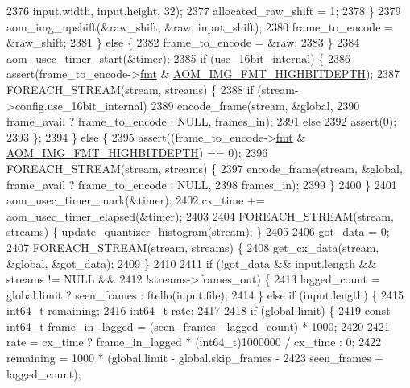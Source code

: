 \begin{DoxyCodeInclude}
{{{{{{{{{{{{{{{{{{{{{{{{{{{{{{{{{{{{{{{{{{{{{{{{{{{{{{{{{{2376                           input.width, input.height, 32);
2377             allocated\_raw\_shift = 1;
2378           \}
2379           aom\_img\_upshift(&raw\_shift, &raw, input\_shift);
2380           frame\_to\_encode = &raw\_shift;
2381         \} \textcolor{keywordflow}{else} \{
2382           frame\_to\_encode = &raw;
2383         \}
2384         aom\_usec\_timer\_start(&timer);
2385         \textcolor{keywordflow}{if} (use\_16bit\_internal) \{
2386           assert(frame\_to\_encode->\hyperlink{structaom__image_a6c64b1ab918d80d52eb8f5d6d957e825}{fmt} & \hyperlink{aom__image_8h_a607b37d91f75442f54223ecd85f1b6cb}{AOM\_IMG\_FMT\_HIGHBITDEPTH});
2387           FOREACH\_STREAM(stream, streams) \{
2388             \textcolor{keywordflow}{if} (stream->config.use\_16bit\_internal)
2389               encode\_frame(stream, &global,
2390                            frame\_avail ? frame\_to\_encode : NULL, frames\_in);
2391             \textcolor{keywordflow}{else}
2392               assert(0);
2393           \};
2394         \} \textcolor{keywordflow}{else} \{
2395           assert((frame\_to\_encode->\hyperlink{structaom__image_a6c64b1ab918d80d52eb8f5d6d957e825}{fmt} & \hyperlink{aom__image_8h_a607b37d91f75442f54223ecd85f1b6cb}{AOM\_IMG\_FMT\_HIGHBITDEPTH}) == 0);
2396           FOREACH\_STREAM(stream, streams) \{
2397             encode\_frame(stream, &global, frame\_avail ? frame\_to\_encode : NULL,
2398                          frames\_in);
2399           \}
2400         \}
2401         aom\_usec\_timer\_mark(&timer);
2402         cx\_time += aom\_usec\_timer\_elapsed(&timer);
2403 
2404         FOREACH\_STREAM(stream, streams) \{ update\_quantizer\_histogram(stream); \}
2405 
2406         got\_data = 0;
2407         FOREACH\_STREAM(stream, streams) \{
2408           get\_cx\_data(stream, &global, &got\_data);
2409         \}
2410 
2411         \textcolor{keywordflow}{if} (!got\_data && input.length && streams != NULL &&
2412             !streams->frames\_out) \{
2413           lagged\_count = global.limit ? seen\_frames : ftello(input.file);
2414         \} \textcolor{keywordflow}{else} \textcolor{keywordflow}{if} (input.length) \{
2415           int64\_t remaining;
2416           int64\_t rate;
2417 
2418           \textcolor{keywordflow}{if} (global.limit) \{
2419             \textcolor{keyword}{const} int64\_t frame\_in\_lagged = (seen\_frames - lagged\_count) * 1000;
2420 
2421             rate = cx\_time ? frame\_in\_lagged * (int64\_t)1000000 / cx\_time : 0;
2422             remaining = 1000 * (global.limit - global.skip\_frames -
2423                                 seen\_frames + lagged\_count);
}}}}}}}}}}}}}}}}}}}}}}}}}}}}}}}}}}}}}}}}}}}}}}}}}}}}}}}}}}
\end{DoxyCodeInclude}
